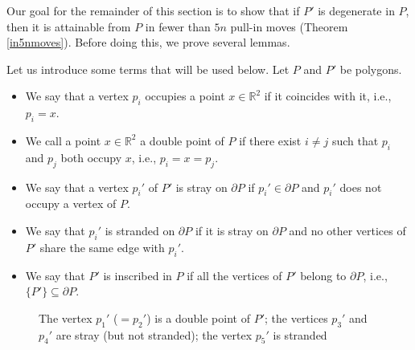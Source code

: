 \documentclass[11pt]{amsart}
\theoremstyle{remark}
\numberwithin{equation}{section}
\newcommand{\R}{\mathbb{R}}
\begin{document}
Our goal for the remainder of this section is to  show that if $P'$ is degenerate in $P$, then it is attainable from $P$ in fewer than $5n$ pull-in moves (Theorem \ref{in5nmoves}). Before doing this, we prove several lemmas.



Let us introduce some terms that will be used below. Let $P$ and $P'$ be polygons. 
\begin{itemize}
\item 
We say that a vertex  $p_i$ occupies a point $x\in \R^2$ if it coincides with it, i.e., $p_i=x$.

\item 
We call a point $x\in \R^2$ a double point of $P$ if there exist $i\neq j$ such that $p_i$ and $p_j$ both occupy $x$, i.e., $p_i=x=p_j$.

\item 
We say that a vertex $p_i'$ of $P'$  is stray on $\partial P$ if $p_i' \in \partial P$ and $p_i'$ does not occupy a vertex of $P$. 

\item 
We say that  $p_i'$ is stranded on $\partial P$ if it is stray on   $\partial P$ and no other vertices of $P'$
share the same edge with $p_i'$.

\item
We say that $P'$ is inscribed in $P$ if all the vertices of $P'$ belong to $\partial P$, i.e., $\{P'\}\subseteq \partial P$. 
\end{itemize}


\begin{figure}[h]
\centering


\caption{The vertex $p_1'$ ($=p_2'$) is a double point of $P'$; the vertices $p_3'$ and $p_4'$ are stray (but not stranded); the vertex $p_5'$ is stranded}
\label{fig_stratstranded}
\end{figure}
\end{document}
